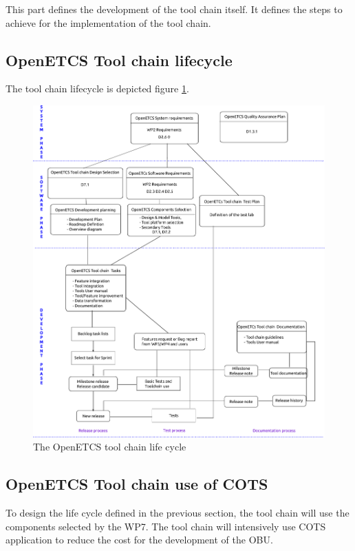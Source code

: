 This part defines the development of the tool chain itself. It defines
the steps to achieve for the implementation of the tool chain.

\subsection{OpenETCS Tool chain lifecycle}
The tool chain lifecycle is depicted figure  \ref{fig:TC_lifecycle}.

\begin{figure}[ tbp]
\centering
  \includegraphics[width= \textwidth]{toolchain_lifecycle}
  \caption{The OpenETCS tool chain life cycle}
  \label{fig:TC_lifecycle}
\end{figure}

\subsection{OpenETCS Tool chain use of \gls{COTS}}
To design the life cycle defined in the previous section, the tool chain will
use the components selected by the WP7.  The tool chain will intensively use 
\gls{COTS} application to reduce   the cost for the development of the
\gls{OBU}.

